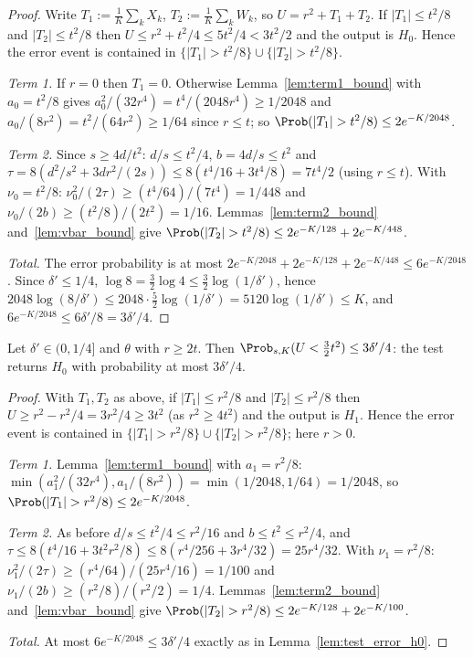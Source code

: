 \begin{proof}
\leanok
{}
Write $T_1 := \frac1K\sum_k X_k$, $T_2 := \frac1K\sum_k W_k$, so $U = r^2 + T_1 + T_2$. If
$|T_1| \le t^2/8$ and $|T_2| \le t^2/8$ then $U \le r^2 + t^2/4 \le 5t^2/4 < 3t^2/2$ and the
output is $H_0$. Hence the error event is contained in
$\{|T_1| > t^2/8\} \cup \{|T_2| > t^2/8\}$.

\emph{Term 1.} If $r = 0$ then $T_1 = 0$. Otherwise Lemma~\ref{lem:term1_bound} with
$a_0 = t^2/8$ gives $a_0^2/(32r^4) = t^4/(2048 r^4) \ge 1/2048$ and
$a_0/(8r^2) = t^2/(64r^2) \ge 1/64$ since $r \le t$; so
$\Prob(|T_1| > t^2/8) \le 2e^{-K/2048}$.

\emph{Term 2.} Since $s \ge 4d/t^2$: $d/s \le t^2/4$, $b = 4d/s \le t^2$ and
$\tau = 8(d^2/s^2 + 3dr^2/(2s)) \le 8(t^4/16 + 3t^4/8) = 7t^4/2$ (using $r \le t$). With
$\nu_0 = t^2/8$: $\nu_0^2/(2\tau) \ge (t^4/64)/(7t^4) = 1/448$ and
$\nu_0/(2b) \ge (t^2/8)/(2t^2) = 1/16$. Lemmas~\ref{lem:term2_bound} and~\ref{lem:vbar_bound}
give $\Prob(|T_2| > t^2/8) \le 2e^{-K/128} + 2e^{-K/448}$.

\emph{Total.} The error probability is at most
$2e^{-K/2048} + 2e^{-K/128} + 2e^{-K/448} \le 6e^{-K/2048}$. Since $\delta' \le 1/4$,
$\log 8 = \tfrac32\log 4 \le \tfrac32\log(1/\delta')$, hence
$2048\log(8/\delta') \le 2048\cdot\tfrac52\log(1/\delta') = 5120\log(1/\delta') \le K$, and
$6e^{-K/2048} \le 6\delta'/8 = 3\delta'/4$.
\end{proof}

\begin{lemma}\label{lem:test_error_h1}
\leanok
{}
Let $\delta' \in (0,1/4]$ and $\theta$ with $r \ge 2t$. Then
$\Prob_{s,K}(U < \tfrac32 t^2) \le 3\delta'/4$: the test returns $H_0$ with probability at
most $3\delta'/4$.
\end{lemma}

\begin{proof}
\leanok
{}
With $T_1, T_2$ as above, if $|T_1| \le r^2/8$ and $|T_2| \le r^2/8$ then
$U \ge r^2 - r^2/4 = 3r^2/4 \ge 3t^2$ (as $r^2 \ge 4t^2$) and the output is $H_1$. Hence the
error event is contained in $\{|T_1| > r^2/8\} \cup \{|T_2| > r^2/8\}$; here $r > 0$.

\emph{Term 1.} Lemma~\ref{lem:term1_bound} with $a_1 = r^2/8$:
$\min(a_1^2/(32r^4), a_1/(8r^2)) = \min(1/2048, 1/64) = 1/2048$, so
$\Prob(|T_1| > r^2/8) \le 2e^{-K/2048}$.

\emph{Term 2.} As before $d/s \le t^2/4 \le r^2/16$ and $b \le t^2 \le r^2/4$, and
$\tau \le 8(t^4/16 + 3t^2r^2/8) \le 8(r^4/256 + 3r^4/32) = 25r^4/32$. With $\nu_1 = r^2/8$:
$\nu_1^2/(2\tau) \ge (r^4/64)/(25r^4/16) = 1/100$ and $\nu_1/(2b) \ge (r^2/8)/(r^2/2) = 1/4$.
Lemmas~\ref{lem:term2_bound} and~\ref{lem:vbar_bound} give
$\Prob(|T_2| > r^2/8) \le 2e^{-K/128} + 2e^{-K/100}$.

\emph{Total.} At most $6e^{-K/2048} \le 3\delta'/4$ exactly as in
Lemma~\ref{lem:test_error_h0}.
\end{proof}

